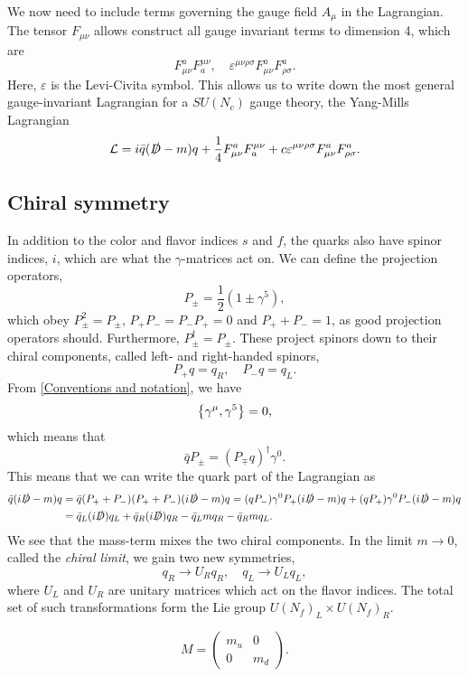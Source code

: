 We now need to include terms governing the gauge field $A_\mu$ in the Lagrangian.
The tensor $F_{\mu\nu}$ allows construct all gauge invariant terms to dimension 4, which are
\begin{equation}
    F_{\mu \nu}^a F_a^{\mu \nu}, 
    \quad 
    \varepsilon^{\mu\nu\rho\sigma} F_{\mu \nu}^a F_{\rho \sigma}^a.
\end{equation}
Here, $\varepsilon$ is the Levi-Civita symbol.
This allows us to write down the most general gauge-invariant Lagrangian for a $SU(N_c)$ gauge theory, the Yang-Mills Lagrangian
\begin{equation}
    \mathcal{L} = i  \bar q (\slashed{D} - m)q 
    + \frac{1}{4} F_{\mu \nu}^a F_a^{\mu \nu}
    + c \varepsilon^{\mu\nu\rho\sigma} F_{\mu \nu}^a F_{\rho \sigma}^a.
\end{equation}

\subsection*{Chiral symmetry}

In addition to the color and flavor indices $s$ and $f$, the quarks also have spinor indices, $i$, which are what the $\gamma$-matrices act on.
We can define the projection operators,
\begin{equation}
    P_\pm = \frac{1}{2}(1 \pm \gamma^5),
\end{equation}
which obey $P_\pm^2 = P_\pm$, $P_+P_- = P_-P_+ = 0$ and $P_+ + P_- = 1$, as good projection operators should.
Furthermore, $P^\dagger_\pm = P_\pm$.
These project spinors down to their chiral components, called left- and right-handed spinors,
\begin{equation}
    P_+ q = q_R, \quad P_- q = q_L.
\end{equation}
From \autoref{Conventions and notation}, we have 
\begin{equation}
    \left\{\gamma^\mu, \gamma^5 \right\} = 0,
\end{equation}
which means that 
\begin{equation}
    \bar q P_\pm = (P_{\mp}q)^\dagger \gamma^0.
\end{equation}
This means that we can write the quark part of the Lagrangian as
\begin{align*}
    \bar q (i\slashed D - m) q
    & = 
    \bar q (P_+ + P_-) (P_+ + P_-) (i\slashed D - m) q
    = (q P_-)\gamma^0 P_+ (i \slashed D - m) q + (q P_+)\gamma^0 P_- (i \slashed D - m) q \\
    & = \bar q_L (i\slashed D) q_L + \bar q_R (i\slashed D) q_R
    - \bar q_L m q_R - \bar q_R m q_L.
\end{align*}
We see that the mass-term mixes the two chiral components.
In the limit $m \rightarrow 0$, called the \emph{chiral limit}, we gain two new symmetries,
\begin{equation}
    q_R \rightarrow U_R q_R, \quad q_L \rightarrow U_L q_L,
\end{equation}
where $U_L$ and $U_R$ are unitary matrices which act on the flavor indices.
The total set of such transformations form the Lie group $U(N_f)_L \times U(N_f)_R$.


\begin{equation}
    \label{Mass matrix}
    M =
    \begin{pmatrix}
        m_u & 0 \\
        0 & m_d
    \end{pmatrix}.
\end{equation}
